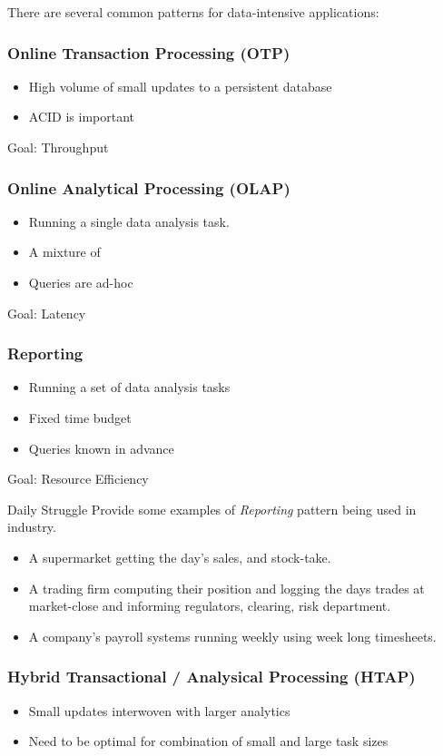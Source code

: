 There are several common patterns for data-intensive applications:
\subsubsection{Online Transaction Processing (OTP)}
\begin{itemize}
    \item High volume of small updates to a persistent database
    \item ACID is important
\end{itemize}
Goal: Throughput

\subsubsection{Online Analytical Processing (OLAP)}
\begin{itemize}
    \item Running a single data analysis task.
    \item A mixture of 
    \item Queries are ad-hoc
\end{itemize}
Goal: Latency

\subsubsection{Reporting}
\begin{itemize}
    \item Running a set of data analysis tasks
    \item Fixed time budget
    \item Queries known in advance
\end{itemize}
Goal: Resource Efficiency
\begin{examplebox}{Daily Struggle}
    Provide some examples of \textit{Reporting} pattern being used in industry.
    \tcblower
    \begin{itemize}
        \item A supermarket getting the day's sales, and stock-take.
        \item A trading firm computing their position and logging the days trades at market-close and informing regulators, clearing, risk department.
        \item A company's payroll systems running weekly using week long timesheets.
    \end{itemize}
\end{examplebox}

\subsubsection{Hybrid Transactional / Analysical Processing (HTAP)}
\begin{itemize}
    \item Small updates interwoven with larger analytics
    \item Need to be optimal for combination of small and large task sizes
\end{itemize}

